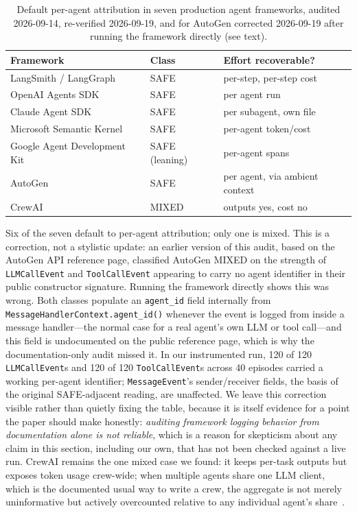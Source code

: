 \begin{table}[t]
\centering
\caption{Default per-agent attribution in seven production agent frameworks,
audited 2026-09-14, re-verified 2026-09-19, and for AutoGen corrected
2026-09-19 after running the framework directly (see text).}
\label{tab:frameworks}
\begin{tabular}{@{}lll@{}}
\toprule
Framework & Class & Effort recoverable? \\
\midrule
LangSmith / LangGraph~\cite{langsmithdocs} & SAFE & per-step, per-step cost \\
OpenAI Agents SDK~\cite{openaiagentssdk} & SAFE & per agent run \\
Claude Agent SDK & SAFE & per subagent, own file \\
Microsoft Semantic Kernel~\cite{semantickerneltokens} & SAFE & per-agent token/cost \\
Google Agent Development Kit~\cite{googleadktraces} & SAFE (leaning) & per-agent spans \\
AutoGen~\cite{autogenlogging} & SAFE & per agent, via ambient context \\
CrewAI~\cite{crewaitracing,crewaiovercountissue} & MIXED & outputs yes, cost no \\
\bottomrule
\end{tabular}
\end{table}

Six of the seven default to per-agent attribution; only one is mixed. This is
a correction, not a stylistic update: an earlier version of this audit, based
on the AutoGen API reference page, classified AutoGen MIXED on the strength of
\texttt{LLMCallEvent} and \texttt{ToolCallEvent} appearing to carry no agent
identifier in their public constructor signature. Running the framework
directly shows this was wrong. Both classes populate an \texttt{agent\_id}
field internally from \texttt{MessageHandlerContext.agent\_id()} whenever the
event is logged from inside a message handler---the normal case for a real
agent's own LLM or tool call---and this field is undocumented on the public
reference page, which is why the documentation-only audit missed it. In our
instrumented run, 120 of 120 \texttt{LLMCallEvent}s and 120 of 120
\texttt{ToolCallEvent}s across 40 episodes carried a working per-agent
identifier; \texttt{MessageEvent}'s sender/receiver fields, the basis of the
original SAFE-adjacent reading, are unaffected. We leave this correction
visible rather than quietly fixing the table, because it is itself evidence
for a point the paper should make honestly: \emph{auditing framework logging
behavior from documentation alone is not reliable}, which is a reason for
skepticism about any claim in this section, including our own, that has not
been checked against a live run. CrewAI remains the one mixed case we found:
it keeps per-task outputs but exposes token usage crew-wide; when multiple
agents share one LLM client, which is the documented usual way to write a
crew, the aggregate is not merely uninformative but actively overcounted
relative to any individual agent's
share~\cite{crewaiovercountissue}.

